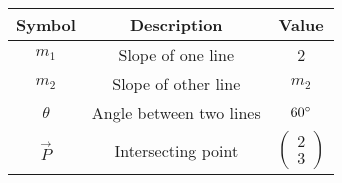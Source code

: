 \begin{tabular}{|c|c|c|}
    \hline
        \textbf{Symbol} &\textbf{Description} &\textbf{Value} \\
        \hline
        $m_1$ & Slope of one line&2\\
        \hline
        $m_2$&Slope of other line &$m_2$\\
        \hline
        $\theta$&Angle between two lines&$60\degree$\\
        \hline
        $\Vec{P}$&Intersecting point &$\begin{pmatrix}
            2\\3
        \end{pmatrix}$\\
       \hline
    \end{tabular}
